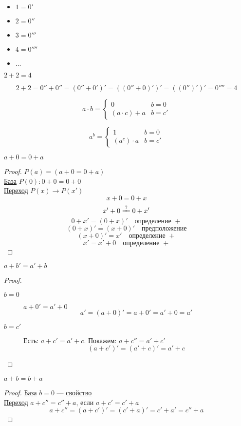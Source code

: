 \documentclass[oneside]{book}
\begin{document}
\begin{definition}
	\-
	\begin{itemize}
		\item \(1 = 0'\)
		\item \(2 = 0''\)
		\item \(3 = 0'''\)
		\item \(4 = 0''''\)
		\item \(\dots\)
	\end{itemize}
\end{definition}
\begin{task}
	\(2 + 2 = 4\)
\end{task}
\begin{solution}
	\[ 2 + 2 = 0'' + 0'' = (0'' + 0')' = ((0'' + 0)')' = ((0'')')' = 0'''' = 4 \]
\end{solution}
\begin{definition}
	\[ a \cdot b = \begin{cases}
			0               & b = 0  \\
			(a \cdot c) + a & b = c'
		\end{cases}\]
	\label{org3f1ed3e}
\end{definition}
\begin{definition}
	\[ a^b = \begin{cases}
			1            & b = 0  \\
			(a^c)\cdot a & b = c'
		\end{cases}\]
	\label{org894ec95}
\end{definition}
\beginproperty
\begin{property}
	\(a + 0 = 0 + a\)
	\label{org2a50bd5}
\end{property}
\begin{proof}
	\(P(a) = (a + 0 = 0 + a)\) \\
	\uline{База} \(P(0): 0 + 0 = 0 + 0\) \\
	\uline{Переход} \(P(x) \to P(x')\)
	\[ x + 0 = 0 + x \]
	\[ x' + 0 \xlongequal{?} 0 + x' \]
	\[ 0 + x' = (0 + x)' \quad\text{определение }+ \]
	\[ (0 + x)' = (x + 0)' \quad\text{предположение} \]
	\[ (x + 0)' = x' \quad\text{определение }+\]
	\[ x' = x' + 0 \quad\text{определение }+ \]
\end{proof}
\begin{property}
	\(a + b' = a' + b\)
\end{property}
\begin{proof}
	\-
	\begin{description}
		\item[{\(b = 0\)}] \(a + 0' = a' + 0\)
			\[ a' = (a + 0)' = a + 0' = a'+0 = a' \]
		\item[{\(b = c'\)}] Есть: \(a + c' = a' + c\). Покажем: \(a + c'' = a' + c'\)
			\[ (a + c')' = (a' + c)' = a' + c \]
	\end{description}
\end{proof}
\begin{property}
	\(a + b = b + a\)
\end{property}
\begin{proof}
	\uline{База} \(b = 0\) --- \hyperref[org2a50bd5]{свойство} \\
	\uline{Переход} \(a + c'' = c'' + a\), если \(a + c' = c' + a\)
	\[ a + c'' = (a + c')' = (c' + a)' = c' + a' = c'' + a\]
\end{proof}
\end{document}
